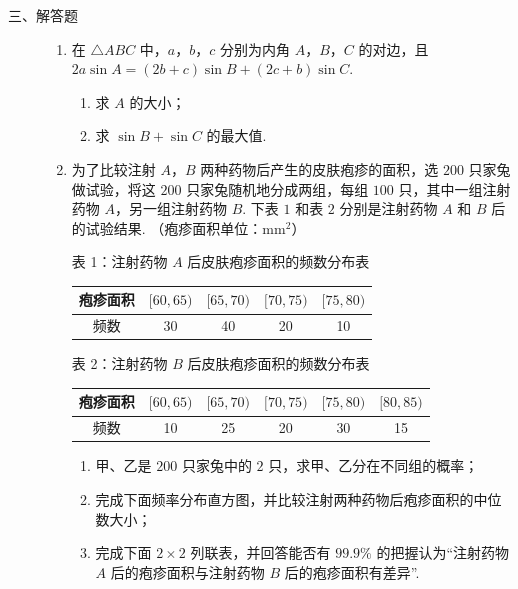 \begin{description}

    \item[三、解答题]

    \begin{enumerate}[leftmargin=5pt]

      \addtocounter{enumi}{+16}

        \item 在 \(\triangle ABC\) 中，\(a\)，\(b\)，\(c\) 分别为内角 \(A\)，\(B\)，\(C\) 的对边，且 \(2a \sin A = (2b + c) \sin B + (2c + b) \sin C\).

\begin{enumerate}
\item 求 \(A\) 的大小；
\item 求 \(\sin B + \sin C\) 的最大值.
\end{enumerate}

        \item 为了比较注射 \(A\)，\(B\) 两种药物后产生的皮肤疱疹的面积，选 \(200\) 只家兔做试验，将这 \(200\) 只家兔随机地分成两组，每组 \(100\) 只，其中一组注射药物 \(A\)，另一组注射药物 \(B\). 下表 \(1\) 和表 \(2\) 分别是注射药物 \(A\) 和 \(B\) 后的试验结果. （疱疹面积单位：\(\mathrm{mm}^2\)）

\begin{center}
表 1：注射药物 \(A\) 后皮肤疱疹面积的频数分布表

\begin{tabular}{|c|c|c|c|c|}
\hline
疱疹面积 & \([60,65)\) & \([65,70)\) & \([70,75)\) & \([75,80)\) \\
\hline
频数 & 30 & 40 & 20 & 10 \\
\hline
\end{tabular}
\end{center}

\begin{center}
表 2：注射药物 \(B\) 后皮肤疱疹面积的频数分布表

\begin{tabular}{|c|c|c|c|c|c|}
\hline
疱疹面积 & \([60,65)\) & \([65,70)\) & \([70,75)\) & \([75,80)\) & \([80,85)\) \\
\hline
频数 & 10 & 25 & 20 & 30 & 15 \\
\hline
\end{tabular}
\end{center}

\begin{enumerate}
\item 甲、乙是 \(200\) 只家兔中的 \(2\) 只，求甲、乙分在不同组的概率；
\item 完成下面频率分布直方图，并比较注射两种药物后疱疹面积的中位数大小；
\item 完成下面 \(2\times2\) 列联表，并回答能否有 \(99.9\%\) 的把握认为“注射药物 \(A\) 后的疱疹面积与注射药物 \(B\) 后的疱疹面积有差异”.
\end{enumerate}


\end{enumerate}
\end{description}
